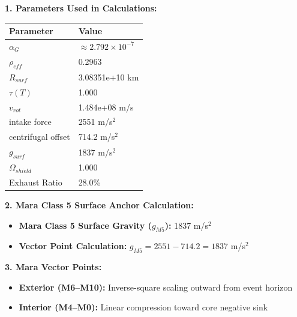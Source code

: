 \documentclass[11pt, a4paper]{article}
\begin{document}
\vspace{0.5em}
\noindent \textbf{1. Parameters Used in Calculations:}
\begin{center}
  \begin{tabular}{|l|l|}
    \hline
    \textbf{Parameter} & \textbf{Value} \\ \hline
    $\alpha_G$ & $\approx 2.792 \times 10^{-7}$ \\ \hline
    $\rho_{eff}$ & 0.2963 \\ \hline
    $R_{surf}$ & 3.08351e+10 km \\ \hline
    $\tau(T)$ & 1.000 \\ \hline
    $v_{rot}$ & 1.484e+08 m/s \\ \hline
    intake force & 2551 m/s$^2$ \\ \hline
    centrifugal offset & 714.2 m/s$^2$ \\ \hline
    $g_{surf}$ & 1837 m/s$^2$ \\ \hline
    $\Omega_{shield}$ & 1.000 \\ \hline
    Exhaust Ratio & 28.0\% \\ \hline
  \end{tabular}
\end{center}

\vspace{0.5em}
\noindent \textbf{2. Mara Class 5 Surface Anchor Calculation:}
\begin{itemize}
  \item \textbf{Mara Class 5 Surface Gravity ($g_{M5}$):} 1837 m/s$^2$
  \item \textbf{Vector Point Calculation:} $g_{M5} = 2551 - 714.2 = 1837$ m/s$^2$
\end{itemize}

\vspace{0.5em}
\noindent \textbf{3. Mara Vector Points:}
\begin{itemize}
  \item \textbf{Exterior (M6--M10):} Inverse-square scaling outward from event horizon
  \item \textbf{Interior (M4--M0):} Linear compression toward core negative sink
\end{itemize}
\end{document}
